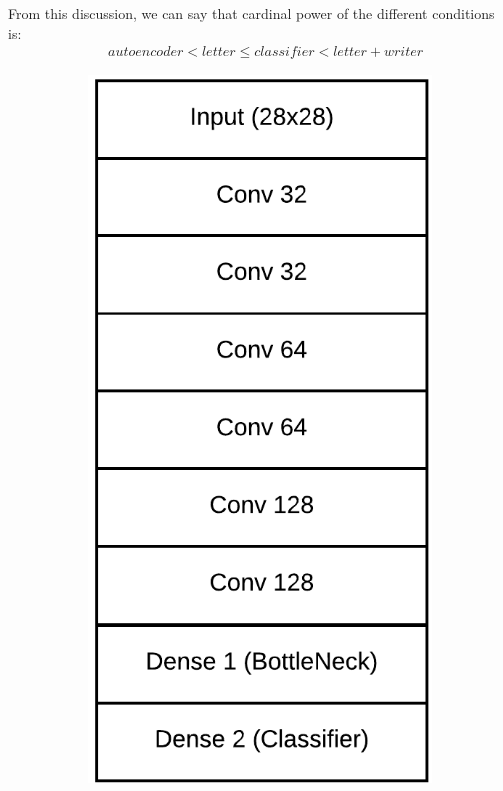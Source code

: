 \par From this discussion, we can say that cardinal power of the different conditions is:
\begin{align}
    & autoencoder < letter \leq classifier < letter+writer
    \label{eq:cardinal_power}
\end{align}

\begin{figure}[!htbp]
    \centering
    \begin{subfigure}{0.4\textwidth}
        \includegraphics[scale=1.0]{images/gbem/classifier.png}

\end{subfigure}
\end{figure}
